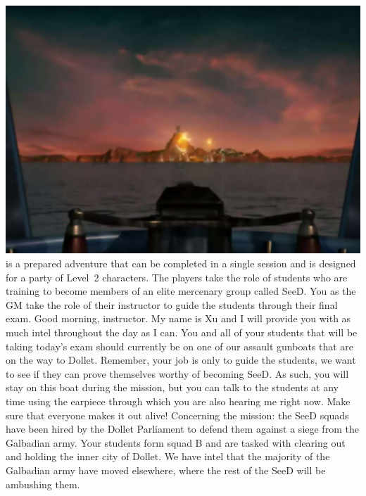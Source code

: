 %
%
\vfill
%
\includegraphics[width=\columnwidth]{./art/siegeofdollet/island.jpg}
%
\vfill
%
 is a prepared adventure that can be completed in a single session and is designed for a party of Level~2 characters.
The players take the role of students who are training to become members of an elite mercenary group called SeeD.
You as the GM take the role of their instructor to guide the students through their final exam.
%
\vfill
%
%
\vfill
%
Good morning, instructor.
My name is Xu and I will provide you with as much intel throughout the day as I can.
You and all of your students that will be taking today's exam should currently be on one of our assault gunboats that are on the way to Dollet.
Remember, your job is only to guide the students, we want to see if they can prove themselves worthy of becoming SeeD.
As such, you will stay on this boat during the mission, but you can talk to the students at any time using the earpiece through which you are also hearing me right now.
Make sure that everyone makes it out alive!
%
\vfill
%
Concerning the mission:
the SeeD squads have been hired by the Dollet Parliament to defend them against a siege from the Galbadian army.
Your students form squad B and are tasked with clearing out and holding the inner city of Dollet.
We have intel that the majority of the Galbadian army have moved elsewhere, where the rest of the SeeD will be ambushing them. 
